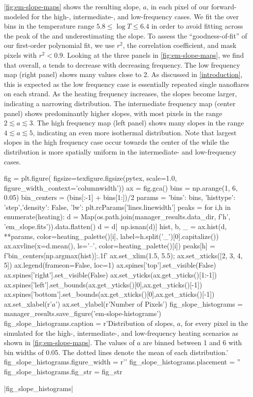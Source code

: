 \autoref{fig:em-slope-maps} shows the resulting \dem{} slope, $a$, in each pixel of our forward-modeled \AR{} for the high-, intermediate-, and low-frequency cases. We fit the \dem{} over bins in the temperature range $5.8\le\log T\le6.4$ in order to avoid fitting across the peak of the \dem{} and underestimating the slope. To assess the ``goodness-of-fit'' of our first-order polynomial fit, we use $r^2$, the correlation coefficient, and mask pixels with $r^2<0.9$. Looking at the three panels in \autoref{fig:em-slope-maps}, we find that overall, $a$ tends to decrease with decreasing frequency. The low frequency map (right panel) shows many values close to 2. As discussed in \autoref{introduction}, this is expected as the low frequency case is essentially repeated single nanoflares on each strand. As the heating frequency increases, the slopes become larger, indicating a narrowing \dem{} distribution. The intermediate frequency map (center panel) shows predominantly higher slopes, with most pixels in the range $2\lesssim a \lesssim 3$. The high frequency map (left panel) shows many slopes in the range $4\lesssim a\lesssim5$, indicating an even more isothermal distribution. Note that largest slopes in the high frequency case occur towards the center of the \AR{} while the distribution is more spatially uniform in the intermediate- and low-frequency cases.

\begin{pycode}
fig = plt.figure(
    figsize=texfigure.figsize(pytex, scale=1.0, figure_width_context='columnwidth'))
ax = fig.gca()
bins = np.arange(1, 6, 0.05)
bin_centers = (bins[:-1] + bins[1:])/2
params = {'bins': bins, 'histtype': 'step','density': False, 
          'lw': plt.rcParams['lines.linewidth']}
peaks = {}
for i,h in enumerate(heating):
    d = Map(os.path.join(manager_results.data_dir, f'{h}', 'em_slope.fits')).data.flatten()
    d = d[~np.isnan(d)]
    hist, b, _ = ax.hist(d, **params, color=heating_palette()[i],
                         label=h.split('_')[0].capitalize())
    ax.axvline(x=d.mean(), ls='--', color=heating_palette()[i])
    peaks[h] = f'{bin_centers[np.argmax(hist)]:.1f}'
ax.set_xlim(1.5, 5.5);
ax.set_xticks([2, 3, 4, 5])
ax.legend(frameon=False, loc=1)
ax.spines['top'].set_visible(False)
ax.spines['right'].set_visible(False)
ax.set_yticks(ax.get_yticks()[1:-1])
ax.spines['left'].set_bounds(ax.get_yticks()[0],ax.get_yticks()[-1])
ax.spines['bottom'].set_bounds(ax.get_xticks()[0],ax.get_xticks()[-1])
ax.set_xlabel(r'$a$')
ax.set_ylabel(r'Number of Pixels')
fig_slope_histograms = manager_results.save_figure('em-slope-histograms')
fig_slope_histograms.caption = r'Distribution of \dem{} slopes, $a$, for every pixel in the simulated \AR{} for the high-, intermediate-, and low-frequency heating scenarios as shown in \autoref{fig:em-slope-maps}. The values of $a$ are binned between 1 and 6 with bin widths of 0.05. The dotted lines denote the mean of each distribution.'
fig_slope_histograms.figure_width = r'\columnwidth'
fig_slope_histograms.placement = ''
fig_slope_histograms.fig_str = fig_str
\end{pycode}
|fig_slope_histograms|

